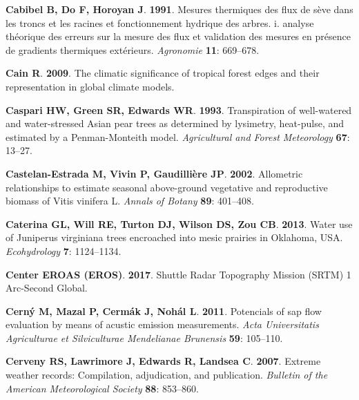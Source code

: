 \documentclass[11pt,twoside]{reedthesis}
\begin{document}
\hypertarget{ref-Cabibel1991}{}
\textbf{\textnormal{Cabibel B}, \textnormal{Do F}, \textnormal{Horoyan
J}}. \textbf{1991}. Mesures thermiques des flux de sève dans les troncs
et les racines et fonctionnement hydrique des arbres. i. analyse
théorique des erreurs sur la mesure des flux et validation des mesures
en présence de gradients thermiques extérieurs. \emph{Agronomie}
\textbf{11}: 669--678.

\hypertarget{ref-Cain2009}{}
\textbf{\textnormal{Cain R}}. \textbf{2009}. The climatic significance
of tropical forest edges and their representation in global climate
models.

\hypertarget{ref-Caspari1993}{}
\textbf{\textnormal{Caspari HW}, \textnormal{Green SR},
\textnormal{Edwards WR}}. \textbf{1993}. Transpiration of well-watered
and water-stressed Asian pear trees as determined by lysimetry,
heat-pulse, and estimated by a Penman-Monteith model. \emph{Agricultural
and Forest Meteorology} \textbf{67}: 13--27.

\hypertarget{ref-Castelan-Estrada2002}{}
\textbf{\textnormal{Castelan-Estrada M}, \textnormal{Vivin P},
\textnormal{Gaudillière JP}}. \textbf{2002}. Allometric relationships to
estimate seasonal above-ground vegetative and reproductive biomass of
Vitis vinifera L. \emph{Annals of Botany} \textbf{89}: 401--408.

\hypertarget{ref-Caterina2014}{}
\textbf{\textnormal{Caterina GL}, \textnormal{Will RE},
\textnormal{Turton DJ}, \textnormal{Wilson DS}, \textnormal{Zou CB}}.
\textbf{2013}. Water use of Juniperus virginiana trees encroached into
mesic prairies in Oklahoma, USA. \emph{Ecohydrology} \textbf{7}:
1124--1134.

\hypertarget{ref-earth_resources_observation_and_science_eros_center_shuttle_2017}{}
\textbf{\textnormal{Center EROAS (EROS)}}. \textbf{2017}. Shuttle Radar
Topography Mission (SRTM) 1 Arc-Second Global.

\hypertarget{ref-Cern2011}{}
\textbf{\textnormal{Cerný M}, \textnormal{Mazal P}, \textnormal{Cermák
J}, \textnormal{Nohál L}}. \textbf{2011}. Potencials of sap flow
evaluation by means of acustic emission measurements. \emph{Acta
Universitatis Agriculturae et Silviculturae Mendelianae Brunensis}
\textbf{59}: 105--110.

\hypertarget{ref-Cerveny2007}{}
\textbf{\textnormal{Cerveny RS}, \textnormal{Lawrimore J},
\textnormal{Edwards R}, \textnormal{Landsea C}}. \textbf{2007}. Extreme
weather records: Compilation, adjudication, and publication.
\emph{Bulletin of the American Meteorological Society} \textbf{88}:
853--860.
\end{document}
